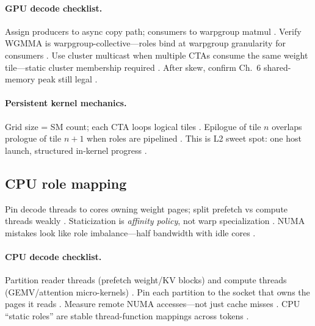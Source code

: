 \paragraph{GPU decode checklist.}
Assign producers to async copy path; consumers to warpgroup matmul \citep{semianalysis2024tma,shah2024flashattention3}.
Verify WGMMA is warpgroup-collective---roles bind at warpgroup granularity for consumers \citep{nvidia2022hopper,patel2025llminference}.
Use cluster multicast when multiple CTAs consume the same weight tile---static cluster membership required \citep{nvidia2022hopper,shah2024flashattention3,yirage2026}.
After skew, confirm Ch.~6 shared-memory peak still legal \citep{dao2022flashattention,memoryfloor2026,chen2020compilerbasedhardw}.

\paragraph{Persistent kernel mechanics.}
Grid size = SM count; each CTA loops logical tiles \citep{shah2024flashattention3,mpk2025}.
Epilogue of tile $n$ overlaps prologue of tile $n{+}1$ when roles are pipelined \citep{shah2024flashattention3,semianalysis2024tma}.
This is L2 sweet spot: one host launch, structured in-kernel progress \citep{nvidia2024cudagraphs,patel2025llminference,taxbreak2026}.

\subsection{CPU role mapping}

Pin decode threads to cores owning weight pages; split prefetch vs compute threads weakly \citep{dlbook,patel2025llminference}.
Staticization is \emph{affinity policy}, not warp specialization \citep{kwon2023vllm,memoryfloor2026}.
NUMA mistakes look like role imbalance---half bandwidth with idle cores \citep{patel2025llminference,taxbreak2026}.

\paragraph{CPU decode checklist.}
Partition reader threads (prefetch weight/KV blocks) and compute threads (GEMV/attention micro-kernels) \citep{dlbook,kwon2023vllm}.
Pin each partition to the socket that owns the pages it reads \citep{patel2025llminference,memoryfloor2026}.
Measure remote NUMA accesses---not just cache misses \citep{taxbreak2026,chen2020compilerbasedhardw}.
CPU ``static roles'' are stable thread-function mappings across tokens \citep{yirage2026,patel2025llminference}.

